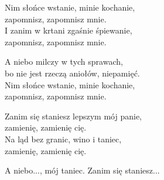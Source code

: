 \begin{text}
    Nim słońce wstanie, minie kochanie,\\
    zapomnisz, zapomnisz mnie.\\
    I zanim w krtani zgaśnie śpiewanie,\\
    zapomnisz, zapomnisz mnie.

    A niebo milczy w tych sprawach,\\
    bo nie jest rzeczą aniołów, niepamięć.\\
    Nim słońce wstanie, minie kochanie,\\
    zapomnisz, zapomnisz mnie.

    Zanim się staniesz lepszym mój panie,\\
    zamienię, zamienię cię.\\
    Na ląd bez granic, wino i taniec,\\
    zamienię, zamienię cię.

    A niebo..., mój taniec. Zanim się staniesz...
\end{text}
\begin{chord}

\end{chord}